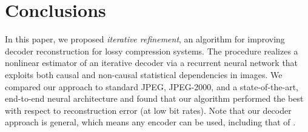 \documentclass[smallabstract,smallcaptions]{dccpaper}
\begin{document}

\section{Conclusions}
In this paper, we proposed \emph{iterative refinement}, an algorithm for improving decoder reconstruction for lossy compression systems. The procedure realizes a nonlinear estimator of an iterative decoder via a recurrent neural network that exploits both causal and non-causal statistical dependencies in images. We compared our approach to standard JPEG, JPEG-2000, and a state-of-the-art, end-to-end neural architecture and found that our algorithm performed the best with respect to reconstruction error (at low bit rates). 
Note that our decoder approach is general, which means any encoder can be used, including that of \cite{toderici2016full}. %




\end{document}
